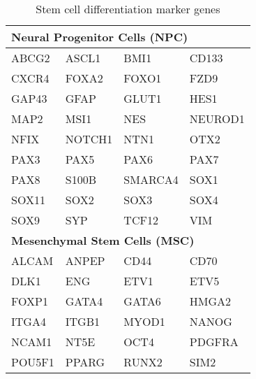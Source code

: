 \documentclass[a4paper,12pt]{article}
\begin{document}
\begin{table}[!htb]
\centering
\small
\caption{Stem cell differentiation marker genes}
\label{table:spscmarkers}
\begin{tabular}{llll}
\toprule
\multicolumn{4}{l}{{\bf Neural Progenitor Cells (NPC)}} \\ \hline
ABCG2\cite{Islam2005} & ASCL1\cite{Castro2011} & BMI1\cite{Molofsky2003} & CD133\cite{Peh2009} \\
CXCR4\cite{Luo2002} & FOXA2\cite{Bang2015, Kirkeby2012} & FOXO1\cite{Kim2015} & FZD9\cite{Fathi2011} \\
GAP43\cite{Livesey2004, Zhao2011} & GFAP\cite{Doetsch1999, Middeldorp2010} & GLUT1\cite{Maurer2006} & HES1\cite{Kobayashi2010, Shimojo2011} \\
MAP2\cite{Kirkeby2012} & MSI1\cite{Kaneko2009} & NES\cite{Murdoch2008} & NEUROD1\cite{Steiner2008} \\
NFIX\cite{Heng2012} & NOTCH1\cite{Yang2004, Cui2004} & NTN1\cite{Dominici2017} & OTX2\cite{Li2005} \\
PAX3\cite{Basch2006, Blake2014} & PAX5\cite{Blake2014} & PAX6\cite{Kirkeby2012, Pankratz2007, Blake2014} & PAX7\cite{Blake2014} \\
PAX8\cite{Blake2014} & S100B\cite{Vives2003} & SMARCA4\cite{Matsumoto2006} & SOX1\cite{Venere2012, Pankratz2007} \\
SOX11\cite{Bergsland2006} & SOX2\cite{Graham2003, Ellis2004} & SOX3\cite{Wang2006} & SOX4\cite{Bergsland2006} \\
SOX9\cite{Scott2010} & SYP\cite{Kirkeby2012} & TCF12\cite{Uittenbogaard2002} & VIM\cite{Nakagawa2004} \\ \hline
\multicolumn{4}{l}{{\bf Mesenchymal Stem Cells (MSC)}} \\ \hline
ALCAM\cite{Arai2002} & ANPEP\cite{Frobel2014} & CD44\cite{Frobel2014, Obara2016} & CD70\cite{Lin2013} \\
DLK1\cite{Abdallah2007, Abdallah2004} & ENG\cite{Lin2013, Obara2016} & ETV1\cite{Kubo2009} & ETV5\cite{Kubo2009} \\
FOXP1\cite{Kubo2009} & GATA4\cite{Almalki2016} & GATA6\cite{Kubo2009} & HMGA2\cite{Kubo2009} \\
ITGA4\cite{Cui2017} & ITGB1\cite{Obara2016} & MYOD1\cite{Almalki2016} & NANOG\cite{Ball2012, Frobel2014} \\
NCAM1\cite{Frobel2014} & NT5E\cite{Frobel2014} & OCT4\cite{Ball2012} & PDGFRA\cite{Ball2012, Farahani2015} \\
POU5F1\cite{Han2014, Matic2016} & PPARG\cite{Almalki2016} & RUNX2\cite{Frobel2014, Almalki2016} & SIM2\cite{Kubo2009} \\

\end{tabular}
\end{table}
\end{document}
